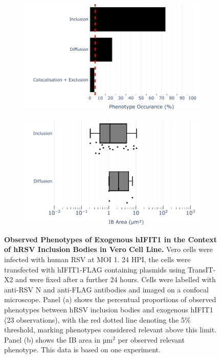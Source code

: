 \begin{figure}
    \begin{subfigure}{0.495\textwidth}
        \caption{}
        \includegraphics[width=1\linewidth]{09. Chapter 4/Figs/02. Overexpression/01. IFIT1/01. bar_i1_hrsv.pdf} 
    \end{subfigure}
    \begin{subfigure}{0.495\textwidth}
        \caption{}
        \includegraphics[width=1\linewidth]{09. Chapter 4/Figs/02. Overexpression/01. IFIT1/02. box_i1_hrsv.pdf}
    \end{subfigure}
    \caption[Observed Phenotypes of Exogenous hIFIT1 in the Context of hRSV Inclusion Bodies in Vero Cell Line.]{\textbf{Observed Phenotypes of Exogenous hIFIT1 in the Context of hRSV Inclusion Bodies in Vero Cell Line.} Vero cells were infected with human RSV at MOI 1. 24 HPI, the cells were transfected with hIFIT1-FLAG containing plasmids using TransIT-X2 and were fixed after a further 24 hours. Cells were labelled with anti-RSV N and anti-FLAG antibodies and imaged on a confocal microscope. Panel (a) shows the percentual proportions of observed phenotypes between hRSV inclusion bodies and exogenous hIFIT1 (23 observations), with the red dotted line denoting the 5\% threshold, marking phenotypes considered relevant above this limit. Panel (b) shows the IB area in \(\mbox{µm}^2\) per observed relevant phenotype. This data is based on one experiment.}
    \label{fig:Observed Phenotypes of Exogenous hIFIT1 in the Context of hRSV Inclusion Bodies in VERO Cell Line}
\end{figure}

